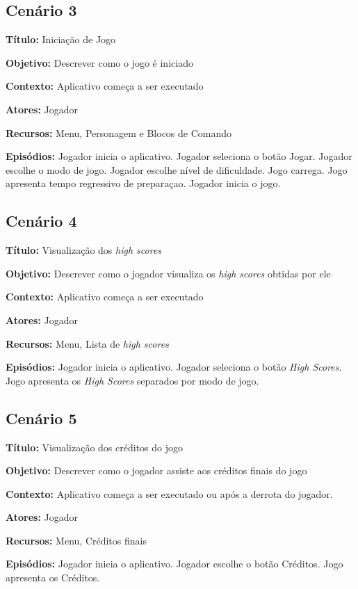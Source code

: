 \subsection{Cenário 3}

\textbf{Título:} Iniciação de Jogo

\textbf{Objetivo:} Descrever como o jogo é iniciado

\textbf{Contexto:} Aplicativo começa a ser executado 

\textbf{Atores:} Jogador

\textbf{Recursos:} Menu, Personagem e Blocos de Comando

\textbf{Episódios:} Jogador inicia o aplicativo. Jogador seleciona o botão Jogar. Jogador escolhe o modo de jogo. Jogador escolhe nível de dificuldade. Jogo carrega. Jogo apresenta tempo regressivo de preparaçao. Jogador inicia o jogo.

\subsection{Cenário 4}

\textbf{Título:} Visualização dos \textit{high scores}

\textbf{Objetivo:} Descrever como o jogador visualiza os \textit{high scores} obtidas por ele

\textbf{Contexto:} Aplicativo começa a ser executado

\textbf{Atores:} Jogador

\textbf{Recursos:} Menu, Lista de \textit{high scores}

\textbf{Episódios:} Jogador inicia o aplicativo. Jogador seleciona o botão \textit{High Scores}. Jogo apresenta os \textit{High Scores} separados por modo de jogo.

\subsection{Cenário 5}

\textbf{Título:} Visualização dos créditos do jogo

\textbf{Objetivo:} Descrever como o jogador assiste aos créditos finais do jogo

\textbf{Contexto:} Aplicativo começa a ser executado ou após a derrota do jogador.

\textbf{Atores:} Jogador

\textbf{Recursos:} Menu, Créditos finais

\textbf{Episódios:} Jogador inicia o aplicativo. Jogador escolhe o botão Créditos. Jogo apresenta os Créditos.


